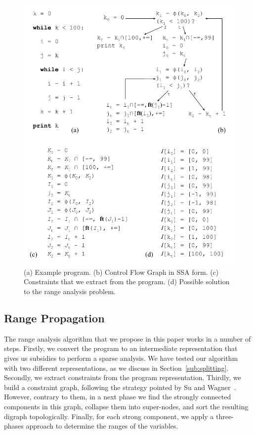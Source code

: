 \documentclass[preprint]{sigplanconf}[10pt]
\begin{document}
\begin{figure}[t!]
\begin{center}
\includegraphics[width=\columnwidth]{images/ex_eSSA_cgo}
\end{center}
\caption{\label{fig:ex_eSSA_cgo}
(a) Example program.
(b) Control Flow Graph in SSA form.
(c) Constraints that we extract from the program.
(d) Possible solution to the range analysis problem.}
\end{figure}

\subsection{Range Propagation}
\label{sub:prop}

The range analysis algorithm that we propose in this paper works in a number
of steps.
Firstly, we convert the program to an intermediate representation that gives
us subsidies to perform a sparse analysis.
We have tested our algorithm with two different representations, as we discuss
in Section~\ref{sub:splitting}.
Secondly, we extract constraints from the program representation.
Thirdly, we build a constraint graph, following the strategy pointed by
Su and Wagner~\cite{Su05}.
However, contrary to them, in a next phase we find the strongly connected
components in this graph, collapse them into super-nodes, and sort the
resulting digraph topologically.
Finally, for each strong component, we apply a three-phases approach to determine
the ranges of the variables.
\end{document}
